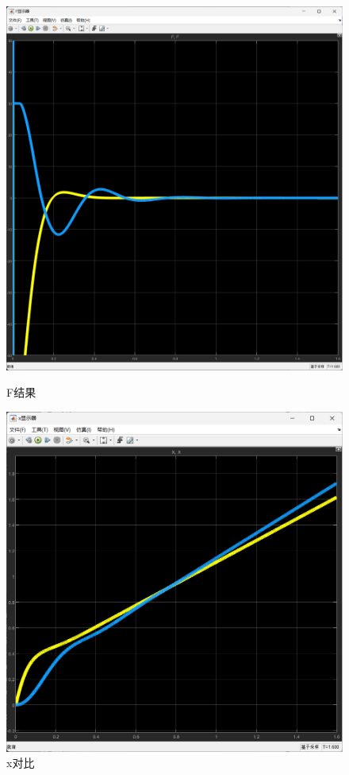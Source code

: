 \documentclass[12pt,a4paper,UTF8]{article}
\begin{document}
\begin{figure}[!htbp]
    \centering
    \begin{minipage}[b]{0.45\linewidth}
        \centering
        \includegraphics[width=0.5\linewidth]{figures/F_3.png}
    \caption{F结果}
    \end{minipage}
    \begin{minipage}[b]{0.45\linewidth}
        \centering
        \includegraphics[width=0.6\linewidth]{figures/x_3.png}
    \caption{x对比}
    \end{minipage}
    

\end{figure}
\end{document}
